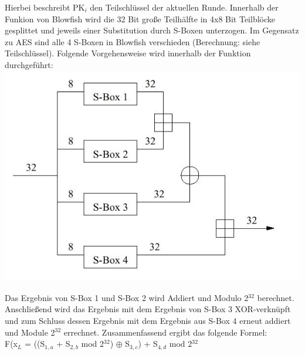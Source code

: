 \documentclass[10pt, a4paper,headsepline,pointednumbers]{scrreprt}
\begin{document}
\begin{minipage}[t]{10cm}

Hierbei beschreibt PK$_{i}$ den Teilschlüssel der aktuellen Runde. Innerhalb der Funkion von Blowfish wird die 32 Bit große Teilhälfte in 4x8 Bit Teilblöcke gesplittet und jeweils einer Substitution durch S-Boxen unterzogen. Im Gegensatz zu AES sind alle 4 S-Boxen in Blowfish verschieden (Berechnung: siehe Teilschlüssel). Folgende Vorgehensweise wird innerhalb der Funktion durchgeführt: \\
\includegraphics[scale=0.25]{blowfish_2.JPG} 
\label{fig:Funktion Blowfish} 
\hfill

Das Ergebnis von S-Box 1 und S-Box 2 wird Addiert und Modulo 2$^{32}$ berechnet. Anschließend wird das Ergebnis mit dem Ergebnis von S-Box 3 XOR-verknüpft und zum Schluss dessen Ergebnis mit dem Ergebnis aus S-Box 4 erneut addiert und Module 2$^{32}$ errechnet. Zusammenfassend ergibt das folgende Formel: \\
F(x$_{L}$ = ((S$_{1,a}$ + S$_{2,b}$ mod 2$^{32}$) $\oplus$ S$_{3,c}$) + S$_{4,d}$ mod 2$^{32}$ \\ \\
\end{minipage}
\end{document}
